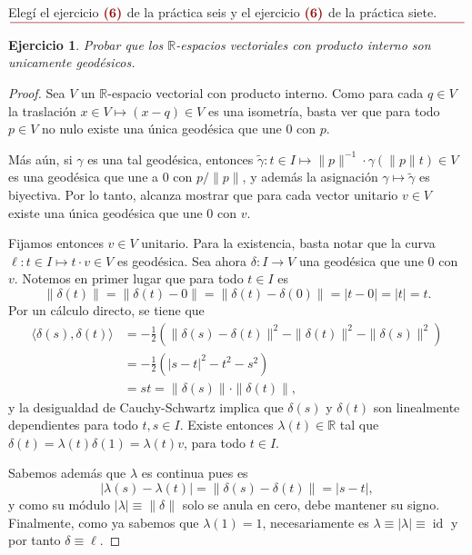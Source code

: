 \documentclass[11pt]{article}
\title{
\LARGE{\paint{Topolog\'ia Algebraica}}
\\
\vspace{5pt}
\small{\paint{Ejercicios para Entregar - Pr\'acticas 6 y 7}}
\\
\vspace{5pt}
\large{\paint{Guido Arnone}}
\\
\paint{
\rule{250pt}{0.5pt}
}
}
\author{}
\date{}
\theoremstyle{colored}
\newtheorem{exercise}{Ejercicio}
\newcommand{\R}{\mathbb{R}}
\newcommand{\id}{\operatorname{id}}
\newcommand{\paint}[1]{\color{color}{#1}}
\newcommand{\tpaint}[1]{\paint{\textbf{#1}}}
\begin{document}
\maketitle

\begin{center}
\paint{\large{Sobre los Ejercicios}}\\
\end{center}

\begin{center}
Elegí el ejercicio $\tpaint{(6)}$ de la práctica seis y el ejercicio $\tpaint{(6)}$ de la práctica siete.
$\paint{
\rule{400pt}{0.5pt}
}$
\vspace{35pt}
\end{center}

\setcounter{exercise}{5}
\begin{exercise} Probar que los $\R$-espacios vectoriales con producto interno son unicamente geodésicos.
\end{exercise}
\begin{proof} Sea $V$ un $\R$-espacio vectorial con producto interno. Como para cada $q \in V$ la traslación $x \in V \mapsto (x - q) \in V$ es una isometría, basta ver que para todo $p \in V$ no nulo existe una única geodésica que une $0$ con $p$. 

Más aún, si $\gamma$ es una tal geodésica, entonces $\tilde{\gamma} : t \in I \mapsto \|p\|^{-1} \cdot \gamma(\|p\|t) \in V$ es una geodésica que une a $0$ con $p/\|p\|$, y además la asignación $\gamma \mapsto \tilde{\gamma}$ es biyectiva. Por lo tanto, alcanza mostrar que para cada vector unitario $v \in V$ existe una única geodésica que une $0$ con $v$. 

Fijamos entonces $v \in V$ unitario. Para la existencia, basta notar que la curva $\ell : t \in I \mapsto t \cdot v \in V$ es geodésica. Sea ahora $\delta: I \to V$ una geodésica que une $0$ con $v$. Notemos en primer lugar que para todo $t \in I$ es 
\[
\|\delta(t)\| = \|\delta(t)-0\| = \|\delta(t)-\delta(0)\| = |t-0| = |t| = t.
\]
Por un cálculo directo, se tiene que
\begin{align*}
\langle \delta(s), \delta(t)\rangle &= -\frac{1}{2}\left(\|\delta(s)-\delta(t)\|^2-\|\delta(t)\|^2-\|\delta(s)\|^2\right)\\
&= -\frac{1}{2}(|s-t|^2-t^2-s^2)\\
&= st = \|\delta(s)\|\cdot\|\delta(t)\|,
\end{align*}
y la desigualdad de Cauchy-Schwartz implica que $\delta(s)$ y $\delta(t)$ son linealmente dependientes para todo $t,s \in I$. Existe entonces $\lambda(t) \in \R$ tal que $\delta(t) = \lambda(t)\delta(1) = \lambda(t)v$, para todo $t \in I$. 

Sabemos además que $\lambda$ es continua pues es \[|\lambda(s)-\lambda(t)| = \|\delta(s)-\delta(t)\| = |s-t|,\]
y como su módulo $|\lambda| \equiv \|\delta\|$ solo se anula en cero, debe mantener su signo. Finalmente, como ya sabemos que $\lambda(1) = 1$, necesariamente es $\lambda \equiv |\lambda| \equiv \id$ y por tanto $\delta \equiv \ell$.
\end{proof}
\end{document}
